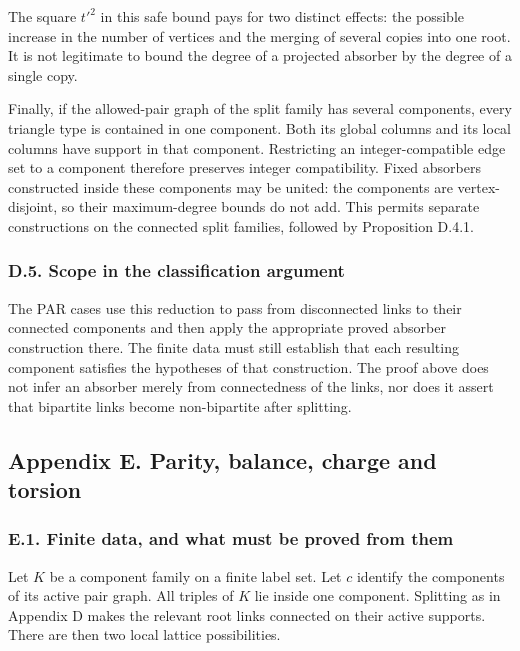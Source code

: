 \documentclass[english,11pt,a4paper]{article}
\begin{document}
The square \(t'^2\) in this safe bound pays for two distinct effects: the possible increase in the number of vertices and the merging of several copies into one root. It is not legitimate to bound the degree of a projected absorber by the degree of a single copy.

Finally, if the allowed-pair graph of the split family has several components, every triangle type is contained in one component. Both its global columns and its local columns have support in that component. Restricting an integer-compatible edge set to a component therefore preserves integer compatibility. Fixed absorbers constructed inside these components may be united: the components are vertex-disjoint, so their maximum-degree bounds do not add. This permits separate constructions on the connected split families, followed by Proposition D.4.1.

\subsubsection{D.5. Scope in the classification argument}\label{d.5.-scope-in-the-classification-argument}

The PAR cases use this reduction to pass from disconnected links to their connected components and then apply the appropriate proved absorber construction there. The finite data must still establish that each resulting component satisfies the hypotheses of that construction. The proof above does not infer an absorber merely from connectedness of the links, nor does it assert that bipartite links become non-bipartite after splitting.

\bigskip

\subsection{Appendix E. Parity, balance, charge and torsion}\label{appendix-e.-parity-balance-charge-and-torsion}

\subsubsection{E.1. Finite data, and what must be proved from them}\label{e.1.-finite-data-and-what-must-be-proved-from-them}

Let \(K\) be a component family on a finite label set. Let \(c\) identify the components of its active pair graph. All triples of \(K\) lie inside one component. Splitting as in Appendix D makes the relevant root links connected on their active supports. There are then two local lattice possibilities.
\end{document}
